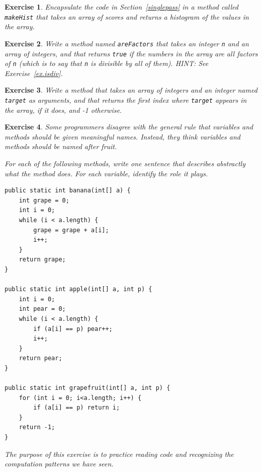 \documentclass[12pt]{book}
\theoremstyle{exercise}
\newtheorem{exercise}{Exercise}[chapter]
\begin{document}
\begin{exercise}
Encapsulate the code in Section~\ref{singlepass} in a method called
{\tt makeHist} that takes an array of scores and returns a histogram
of the values in the array.
\end{exercise}


\begin{exercise}
Write a method named {\tt areFactors} that takes
an integer {\tt n} and an array of integers, and that returns
{\tt true} if the numbers in the array are all factors of {\tt n}
(which is to say that {\tt n} is divisible by all of them).
HINT: See Exercise~\ref{ex.isdiv}.
\end{exercise}


\begin{exercise}
Write a method that takes an array of integers and an integer named
{\tt target} as arguments, and that returns the first index where
{\tt target} appears in the array, if it does, and -1 otherwise.
\end{exercise}


\begin{exercise}
Some programmers disagree with the general rule that variables
and methods should be given meaningful names.  Instead, they
think variables and methods should be named after fruit.

For each of the following methods, write one sentence that
describes abstractly what the method does.  For each variable,
identify the role it plays.

\begin{lstlisting}
public static int banana(int[] a) {
    int grape = 0;
    int i = 0;
    while (i < a.length) {
        grape = grape + a[i];
        i++;
    }
    return grape;
}

public static int apple(int[] a, int p) {
    int i = 0;
    int pear = 0;
    while (i < a.length) {
        if (a[i] == p) pear++;
        i++;
    }
    return pear;
}

public static int grapefruit(int[] a, int p) {
    for (int i = 0; i<a.length; i++) {
        if (a[i] == p) return i;
    }
    return -1;
}
\end{lstlisting}

The purpose of this exercise is to practice reading code and
recognizing the computation patterns we have seen.
\end{exercise}
\end{document}
